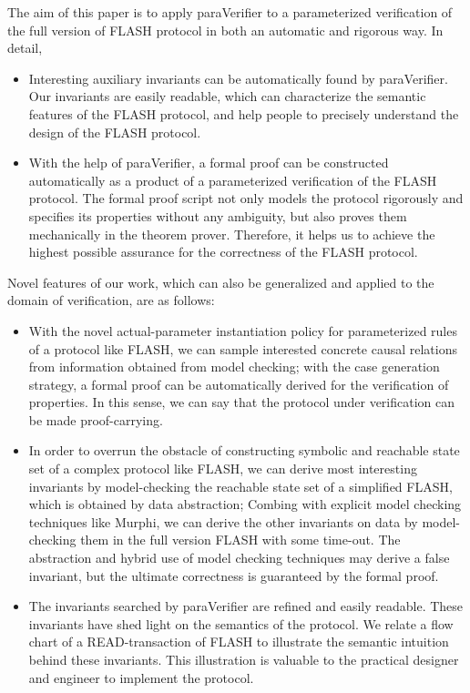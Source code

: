 \documentclass{llncs-new}
\newcommand{\bedt}[1]{{\color{black}#1}}
\begin{document}
The aim of this paper is to apply {\sf paraVerifier} \cite{liatva2015} to a  parameterized verification of the full version of FLASH protocol in both an automatic and rigorous way. In detail,
\vspace{-5pt}
\begin{itemize}
\item Interesting auxiliary invariants can be  automatically found by {\sf paraVerifier}. Our invariants are \bedt{easily readable}, which can characterize the semantic features of the FLASH protocol, and help people to precisely understand the design of the  FLASH protocol.

\item With the help of {\sf paraVerifier}, a formal proof can be constructed automatically as a product of a parameterized verification of the FLASH protocol. The formal proof script not  only models the protocol rigorously and specifies its properties without any ambiguity, but also proves them mechanically in the theorem prover. Therefore, it helps us to achieve the highest possible assurance for the correctness of the FLASH protocol.


\end{itemize}
\vspace{-5pt}
Novel features of our work, which can also be generalized and applied to the domain of verification, are as follows:
\begin{itemize}
\item With the novel  actual-parameter instantiation policy for parameterized rules of a protocol like FLASH, we can sample interested concrete causal relations from information obtained from model checking; with the case generation strategy,   a formal proof can be automatically derived for the verification of properties. In this sense, we can say that the protocol under verification can be made proof-carrying.

\item In order to overrun the obstacle of constructing symbolic and reachable state set of a complex protocol like FLASH,  we can derive most interesting invariants by  model-checking  the reachable state set of a simplified  FLASH, which is obtained by data abstraction; Combing with explicit model checking techniques like Murphi, we can derive the other invariants on data by model-checking them in the full version FLASH  with some time-out. The abstraction and hybrid use of model checking techniques may derive a false invariant, but the ultimate correctness is guaranteed by the formal proof.

\item The invariants searched by {\sf paraVerifier} are refined and easily readable.  These invariants have shed light on the semantics of the
protocol. We relate  a flow chart of a READ-transaction of FLASH to illustrate the semantic intuition behind these invariants. This illustration is valuable to the practical designer and engineer to implement the protocol.

\end{itemize}
\end{document}
